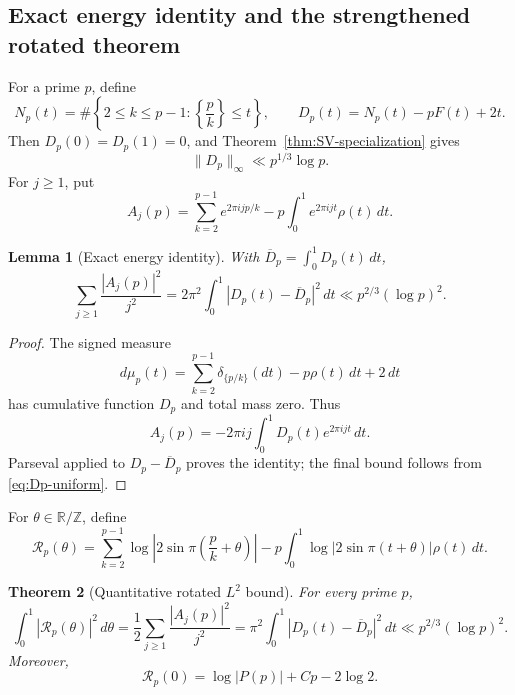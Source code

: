 \documentclass[11pt]{amsart}
\numberwithin{equation}{section}
\newtheorem{theorem}{Theorem}[section]
\newtheorem{lemma}[theorem]{Lemma}
\theoremstyle{definition}
\theoremstyle{remark}
\begin{document}
\subsection{Exact energy identity and the strengthened rotated theorem}

For a prime \(p\), define
\begin{equation}\label{eq:Np-Dp}
 N_p(t)=\#\left\{2\le k\le p-1:\left\{\frac pk\right\}\le t\right\},
 \qquad D_p(t)=N_p(t)-pF(t)+2t.
\end{equation}
Then \(D_p(0)=D_p(1)=0\), and
Theorem~\ref{thm:SV-specialization} gives
\begin{equation}\label{eq:Dp-uniform}
 \|D_p\|_\infty\ll p^{1/3}\log p.
\end{equation}
For \(j\ge1\), put
\begin{equation}\label{eq:Aj-def}
 A_j(p)=\sum_{k=2}^{p-1}e^{2\pi i jp/k}
 -p\int_0^1e^{2\pi ijt}\rho(t)\,dt.
\end{equation}

\begin{lemma}[Exact energy identity]\label{lem:Aj-energy}
With \(\overline D_p=\int_0^1D_p(t)\,dt\),
\begin{equation}\label{eq:Aj-energy}
 \sum_{j\ge1}\frac{|A_j(p)|^2}{j^2}
 =2\pi^2\int_0^1|D_p(t)-\overline D_p|^2\,dt
 \ll p^{2/3}(\log p)^2.
\end{equation}
\end{lemma}

\begin{proof}
The signed measure
\[
 d\mu_p(t)=\sum_{k=2}^{p-1}\delta_{\{p/k\}}(dt)
 -p\rho(t)\,dt+2\,dt
\]
has cumulative function \(D_p\) and total mass zero.  Thus
\[
 A_j(p)=-2\pi i j\int_0^1D_p(t)e^{2\pi ijt}\,dt.
\]
Parseval applied to \(D_p-\overline D_p\) proves the identity; the final
bound follows from \eqref{eq:Dp-uniform}.
\end{proof}

For \(\theta\in\mathbb R/\mathbb Z\), define
\begin{equation}\label{eq:rotated-remainder}
 \mathscr R_p(\theta)=
 \sum_{k=2}^{p-1}\log\left|2\sin\pi\left(\frac pk+\theta\right)\right|
 -p\int_0^1\log|2\sin\pi(t+\theta)|\rho(t)\,dt.
\end{equation}

\begin{theorem}[Quantitative rotated \(L^2\) bound]\label{thm:rotated-L2}
For every prime \(p\),
\begin{equation}\label{eq:rotated-L2}
 \int_0^1|\mathscr R_p(\theta)|^2\,d\theta
 =\frac12\sum_{j\ge1}\frac{|A_j(p)|^2}{j^2}
 =\pi^2\int_0^1|D_p(t)-\overline D_p|^2\,dt
 \ll p^{2/3}(\log p)^2.
\end{equation}
Moreover,
\begin{equation}\label{eq:theta-zero-original}
 \mathscr R_p(0)=\log|P(p)|+Cp-2\log2.
\end{equation}
\end{theorem}
\end{document}

